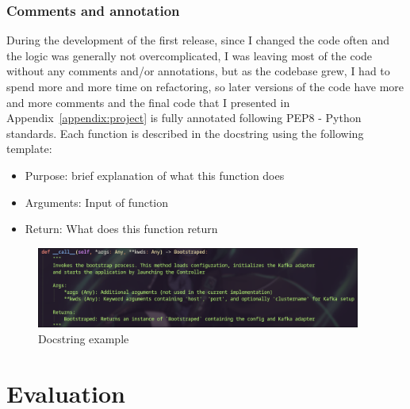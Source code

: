 \documentclass[10pt , a4paper]{report}
\begin{document}
\newpage
\subsection{Comments and annotation}

During the development of the first release, since I changed the code often and the logic was generally not overcomplicated, I was leaving most of the code without any comments and/or annotations, but as the codebase grew, I had to spend more and more time on refactoring, so later versions of the code have more and more comments and the final code that I presented in Appendix~\ref{appendix:project} is fully annotated following PEP8 - Python standards. Each function is described in the docstring using the following template:

\begin{itemize}
\item Purpose: brief explanation of what this function does
\item Arguments: Input of function
\item Return: What does this function return
\end{itemize}

\begin{figure}[htbp]
  \begin{center}
    \includegraphics[width=0.95\textwidth]{imgs/DocStringExample.png}
  \end{center}
  \caption{Docstring example}\label{fig:}
\end{figure}


\newpage
\chapter{Evaluation}
\end{document}
